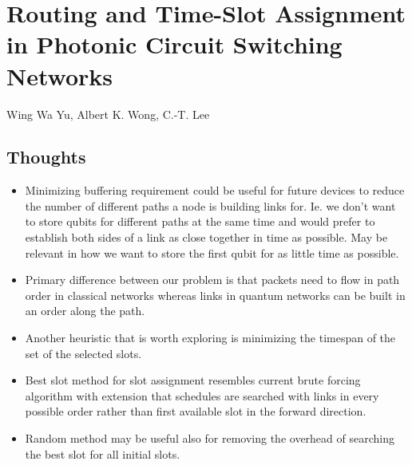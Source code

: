 \documentclass{article}
\begin{document}
\section{Routing and Time-Slot Assignment in Photonic Circuit Switching Networks}
Wing Wa Yu, Albert K. Wong, C.-T. Lee

\subsection{Thoughts}
\begin{itemize}
    \item Minimizing buffering requirement could be useful for future devices to reduce the number of different paths a node is building links for.  Ie. we don't want to store qubits for different paths at the same time and would prefer to establish both sides of a link as close together in time as possible.  May be relevant in how we want to store the first qubit for as little time as possible.
    \item Primary difference between our problem is that packets need to flow in path order in classical networks whereas links in quantum networks can be built in an order along the path.
    \item Another heuristic that is worth exploring is minimizing the timespan of the set of the selected slots.
    \item Best slot method for slot assignment resembles current brute forcing algorithm with extension that schedules are searched with links in every possible order rather than first available slot in the forward direction.
    \item Random method may be useful also for removing the overhead of searching the best slot for all initial slots.
\end{itemize}
\end{document}
